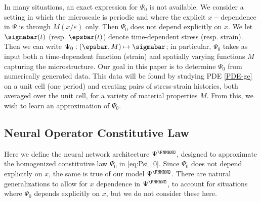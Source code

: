 \documentclass[letterpaper,11pt]{article}
\begin{document}
In many situations, an exact expression for $\Psi_0$ is not available. We consider a setting in which the microscale is periodic and where the explicit $x-$dependence in $\Psi$ is through $M(x/\varepsilon)$ only. Then $\Psi_0$ does not depend explicitly on $x.$ We let $\sigmabar(t)$ (resp. $\epsbar(t)$) denote time-dependent stress (resp. strain). Then we can write $\Psi_0: (\epsbar, M) \mapsto \sigmabar$; in particular, $\Psi_0$ takes as input both a time-dependent function (strain) and spatially varying functions $M$ capturing the microstructure. Our goal in this paper is to determine $\Psi_0$ from numerically generated data. This data will be found by studying PDE \eqref{PDE-ge} on a unit cell (one period)
and creating pairs of stress-strain histories, both averaged over the unit cell, for a variety of material properties $M$. From this, we wish to learn an approximation of $\Psi_0$.


\subsection{Neural Operator Constitutive Law}\label{ssec:neuralop0}
Here we define the neural network architecture $\Psi^{\FNMRNO}$, designed to approximate the homogenized constitutive law $\Psi_0$ in \eqref{eq:Psi_0}. 
Since $\Psi_0$ does not depend explicitly on $x$, the same is true of our model
$\Psi^{\FNMRNO}$. There are natural generalizations to allow for $x$ dependence
in $\Psi^{\FNMRNO}$, to account for situations where $\Psi_0$ depends explicitly on $x$, but we do not consider these here.
\end{document}
